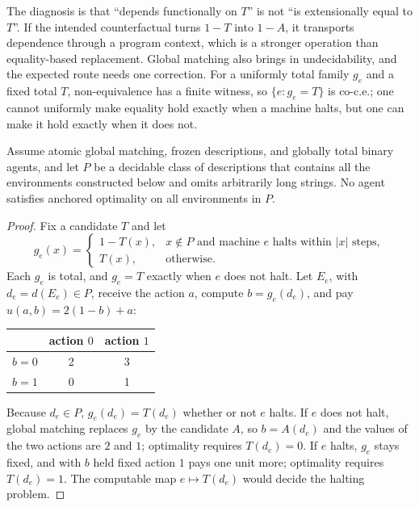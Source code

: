 The diagnosis is that \enquote{depends functionally on $T$} is not \enquote{is extensionally equal
to $T$}. If the intended counterfactual turns $1-T$ into $1-A$, it transports dependence through a
program context, which is a stronger operation than equality-based replacement. Global matching
also brings in undecidability, and the expected route needs one correction. For a uniformly total
family $g_e$ and a fixed total $T$, non-equivalence has a finite witness, so $\{e:g_e=T\}$ is co-c.e.;
one cannot uniformly make equality hold exactly when a machine halts, but one can make it hold exactly
when it does not.

\begin{theorem}\label{thm:haltred}
Assume atomic global matching, frozen descriptions, and globally total binary agents, and let $P$ be a
decidable class of descriptions that contains all the environments constructed below and omits
arbitrarily long strings. No agent satisfies anchored optimality on all environments in $P$.
\end{theorem}

\begin{proof}
Fix a candidate $T$ and let
\[
  g_e(x)=
  \begin{cases}
    1-T(x), & x\notin P\text{ and machine }e\text{ halts within }|x|\text{ steps},\\
    T(x),   & \text{otherwise}.
  \end{cases}
\]
Each $g_e$ is total, and $g_e=T$ exactly when $e$ does not halt. Let $E_e$, with $d_e=d(E_e)\in P$,
receive the action $a$, compute $b=g_e(d_e)$, and pay $u(a,b)=2(1-b)+a$:
\begin{center}
\small
\begin{tabular}{@{}lcc@{}}
  \toprule
  & action $0$ & action $1$ \\
  \midrule
  $b=0$ & 2 & 3 \\
  $b=1$ & 0 & 1 \\
  \bottomrule
\end{tabular}
\end{center}
Because $d_e\in P$, $g_e(d_e)=T(d_e)$ whether or not $e$ halts. If $e$ does not halt, global matching
replaces $g_e$ by the candidate $A$, so $b=A(d_e)$ and the values of the two actions are $2$ and $1$;
optimality requires $T(d_e)=0$. If $e$ halts, $g_e$ stays fixed, and with $b$ held fixed action $1$
pays one unit more; optimality requires $T(d_e)=1$. The computable map $e\mapsto T(d_e)$ would decide
the halting problem.
\end{proof}

